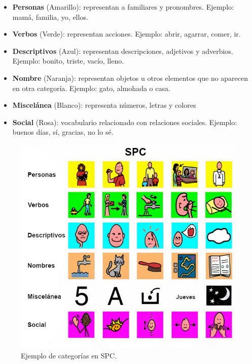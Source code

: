 \begin{itemize}
	\item \textbf{Personas} (Amarillo): representan a familiares y pronombres. Ejemplo: mamá, familia,  yo, ellos.
	\item \textbf{Verbos} (Verde): representan acciones. Ejemplo: abrir, agarrar, comer, ir.
	\item \textbf{Descriptivos} (Azul): representan descripciones, adjetivos y adverbios. Ejemplo: bonito, triste, vacío, lleno.
	\item \textbf{Nombre} (Naranja): representan objetos u otros elementos que no aparecen en otra categoría. Ejemplo: gato, almohada o casa.
	\item \textbf{Miscelánea} (Blanco): representa números, letras y colores
	\item \textbf{Social} (Rosa): vocabulario relacionado con relaciones sociales. Ejemplo: buenos días, sí, gracias, no lo sé.
	
\end{itemize}

\begin{figure}[h!]
	\centering
	\includegraphics[width=0.8\linewidth]{Imagenes/Bitmap/SPCcolores}
	\caption{Ejemplo de categorías en SPC.}
	\label{fig:spccolores}
\end{figure}

